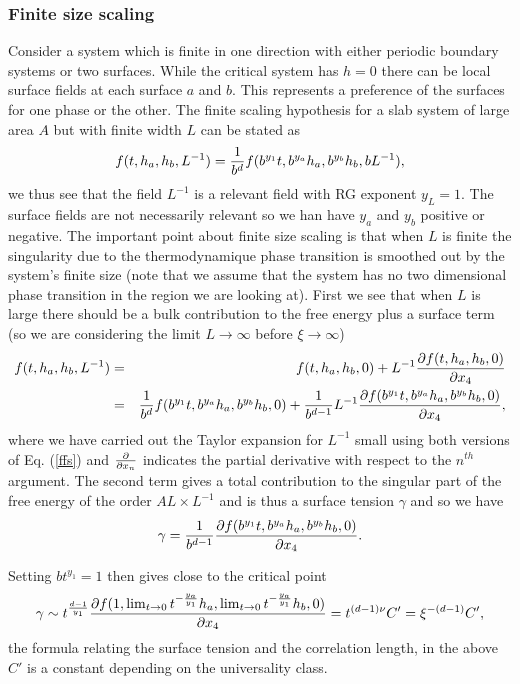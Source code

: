     \subsubsection{Finite size scaling}
Consider a system which is finite in one direction with either periodic boundary systems or 
two surfaces. While the critical system has $h=0$ there can be local surface fields at each surface $a$ and $b$. This represents a preference of the surfaces for one phase or the other. 
The finite scaling hypothesis for a slab  system of large area $A$ but with finite width $L$ can be stated as
\begin{equation}
    f(t,h_a,h_b,L^{-1}) = {1\over b^{d}}f(b^{y_1}t, b^{y_a} h_a, b^{y_b} h_b, bL^{-1}), \label{ffs}
\end{equation}
we thus see that the field $L^{-1}$ is a relevant field with RG exponent $y_L=1$. 
The surface fields are not necessarily relevant so we han have $y_a$ and $y_b$ positive or negative. The important point about finite size scaling is that when $L$ is finite the singularity due to the thermodynamique phase transition is smoothed out by the system's finite size (note that we assume that the system has no two dimensional phase transition in the region we are looking at). First we see that when $L$ is large there should be a bulk contribution to the free energy plus a surface term (so we are considering the limit $L\to\infty$ before $\xi\to\infty$)
\begin{eqnarray}
f(t,h_a,h_b,L^{-1})&=& f(t,h_a,h_b,0) + L^{-1}{\partial f(t,h_a,h_b,0)\over \partial x_4} \nonumber\\&=& {1\over  b^d} f(b^{y_1}t, b^{y_a} h_a, b^{y_b} h_b,0)+{1\over  b^{d-1}}L^{-1}{\partial f(b^{y_1}t, b^{y_a} h_a, b^{y_b} h_b, 0)\over \partial x_4},
\end{eqnarray}
where we have carried out the Taylor expansion for $L^{-1}$ small using both versions of Eq. (\ref{ffs}) and ${\partial \over \partial x_n}$ indicates the partial derivative with respect to the $n^{th}$ argument. 
The second term gives a total contribution to the singular part of the free energy of the order $AL \times L^{-1}$ and is thus a surface tension $\gamma$  and so we have
\begin{equation}
    \gamma= {1\over  b^{d-1}}{\partial f(b^{y_1}t, b^{y_a} h_a, b^{y_b} h_b, 0)\over \partial x_4}.
\end{equation}


Setting $bt^{y_1}=1$ then gives close to the critical point
\begin{equation}
    \gamma \sim t^{d-1\over y_1}{\partial f(1,\lim_{t\to 0}  t^{-\frac{y_a}{y_1}}h_a, \lim_{t\to 0}  t^{-\frac{y_a}{y_1}}h_b,0)\over \partial x_4} = t^{(d-1)\nu}C' = \xi^{-(d-1)}C',
\end{equation}
the formula relating the surface tension and the correlation length, in the above $C'$ is a constant depending on the universality class. 

